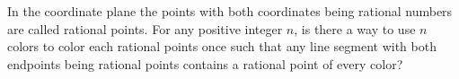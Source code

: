 In the coordinate plane the points with both coordinates being rational numbers are called rational points. For any positive integer $n$, is there a way to use $n$ colors to color each rational points once such that any line segment with both endpoints being rational points contains a rational point of every color?